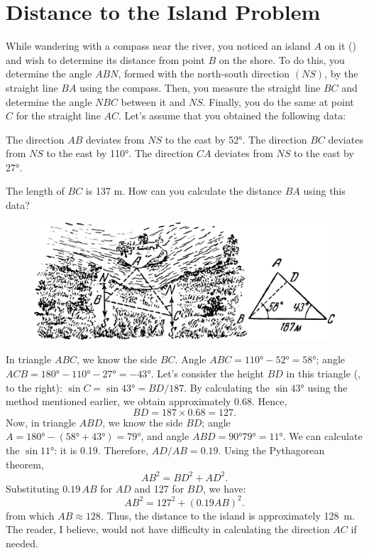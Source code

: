 \section{Distance to the Island Problem}
\label{sec-5.5}

While wandering with a compass near the river, you noticed an island $A$ on it () and wish to determine its distance from point $B$ on the shore. To do this, you determine the angle $ABN$, formed with the north-south direction $(NS)$, by the straight line $BA$ using the compass. Then, you measure the straight line $BC$ and determine the angle $NBC$ between it and $NS$. Finally, you do the same at point $C$ for the straight line $AC$. Let's assume that you obtained the following data:

The direction $AB$ deviates from $NS$ to the east by \ang{52}.
The direction $BC$ deviates from $NS$ to the east by \ang{110}.
The direction $CA$ deviates from $NS$ to the east by \ang{27}.


The length of $BC$ is 137 m. How can you calculate the distance $BA$ using this data?

\begin{figure}[h!]
\centering
\includegraphics[width=\textwidth]{figures/ch-05/fig-093.pdf}
\end{figure}

\ans In triangle $ABC$, we know the side $BC$. Angle $ABC = \ang{110} - \ang{52} = \ang{58}$; angle $ACB = \ang{180} - \ang{110} - \ang{27} = -\ang{43}$. Let's consider the height $BD$ in this triangle (, to the right): $\sin C = \sin \ang{43} = BD/187$. By calculating the $\sin \ang{43}$ using the method mentioned earlier, we obtain approximately 0.68. Hence, 
\begin{equation*}%
BD = 187 \times 0.68 = 127.
\end{equation*}
Now, in triangle $ABD$, we know the side $BD$; angle $A = \ang{180} - (\ang{58} + \ang{43}) = \ang{79}$, and angle $ABD = \ang{90}  \ang{79} = \ang{11}$. We can calculate the $\sin \ang{11}$: it is 0.19. Therefore, $AD/AB = 0.19$. Using the Pythagorean theorem, 
\begin{equation*}%
AB^{2} = BD^{2} + AD^{2}.
\end{equation*}
Substituting $0.19 \, AB$ for $AD$ and 127 for $BD$, we have: 
\begin{equation*}%
AB^{2} = 127^{2} + (0.19AB)^{2}.
\end{equation*}
from which $AB \approx 128$. Thus, the distance to the island is approximately \SI{128}{\meter}. The reader, I believe, would not have difficulty in calculating the direction $AC$ if needed.

